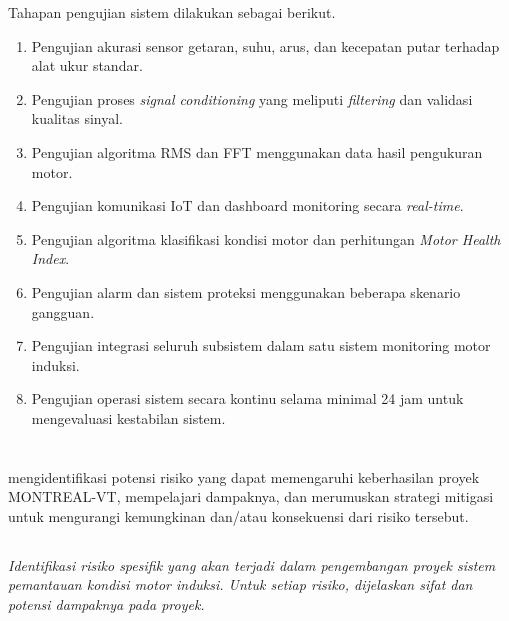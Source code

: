 \documentclass{elsinta}
\begin{document}
Tahapan pengujian sistem dilakukan sebagai berikut.

\begin{enumerate}
\item Pengujian akurasi sensor getaran, suhu, arus, dan kecepatan putar terhadap alat ukur standar.
\item Pengujian proses \textit{signal conditioning} yang meliputi \textit{filtering} dan validasi kualitas sinyal.
\item Pengujian algoritma RMS dan FFT menggunakan data hasil pengukuran motor.
\item Pengujian komunikasi IoT dan dashboard monitoring secara \textit{real-time}.
\item Pengujian algoritma klasifikasi kondisi motor dan perhitungan \textit{Motor Health Index}.
\item Pengujian alarm dan sistem proteksi menggunakan beberapa skenario gangguan.
\item Pengujian integrasi seluruh subsistem dalam satu sistem monitoring motor induksi.
\item Pengujian operasi sistem secara kontinu selama minimal 24 jam untuk mengevaluasi kestabilan sistem.
\end{enumerate} 

\newpage
\section{\RiskAssessmentTitle}

mengidentifikasi potensi risiko yang dapat memengaruhi keberhasilan proyek MONTREAL-VT, mempelajari dampaknya, dan merumuskan strategi mitigasi untuk mengurangi kemungkinan dan/atau konsekuensi dari risiko tersebut.

\subsection{\TechFinancialRiskTitle}
\textit{Identifikasi risiko spesifik yang akan terjadi dalam pengembangan proyek sistem pemantauan kondisi motor induksi. Untuk setiap risiko, dijelaskan sifat dan potensi dampaknya pada proyek. }
\end{document}
